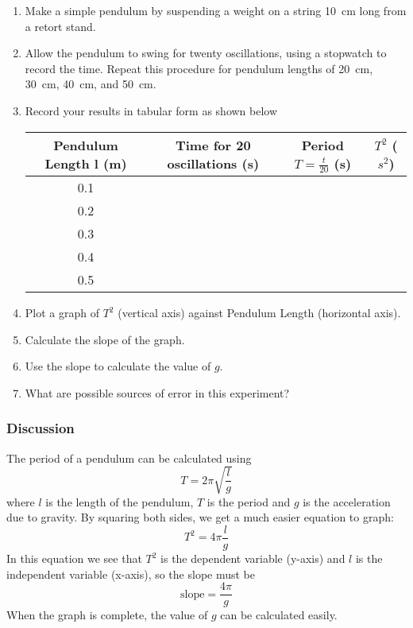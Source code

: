\begin{enumerate}
\item{Make a simple pendulum by suspending a weight on a string 10~cm long from a retort
stand.}
\item{Allow the pendulum to swing for twenty oscillations, using a stopwatch to record the
time. Repeat this procedure for pendulum lengths of 20~cm, 30~cm, 40~cm, and 50~cm.}
\item{Record your results in tabular form as shown below}

\begin{center}
\begin{tabular}{ | c | c | c | c | }
\hline
Pendulum Length l (m) & Time for 20 oscillations (s) & Period $T = \frac{t}{20}$ (s) & $T^2$ ($s^2$) \\ \hline
0.1 & & & \\ \hline
0.2 & & & \\ \hline
0.3 & & & \\ \hline
0.4 & & & \\ \hline
0.5 & & & \\ \hline
\end{tabular}
\end{center}

\item{Plot a graph of $T^2$ (vertical axis) against Pendulum Length (horizontal axis).}
\item{Calculate the slope of the graph.}
\item{Use the slope to calculate the value of $g$.}
\item{What are possible sources of error in this experiment?}

\end{enumerate}

\subsubsection{Discussion}

The period of a pendulum can be calculated using $$T = 2\pi\sqrt{\frac{l}{g}}$$
where $l$ is the length of the pendulum, $T$ is the period and $g$ is the acceleration due to
gravity. By squaring both sides, we get a much easier equation to graph: $$T^2 = 4\pi\frac{l}{g}$$ In this equation we see that $T^2$ is the dependent variable (y-axis) and $l$ is the
independent variable (x-axis), so the slope must be $$\mathrm{slope} = \frac{4\pi}{g}$$ 
When the graph is complete, the value of $g$ can be calculated easily.

